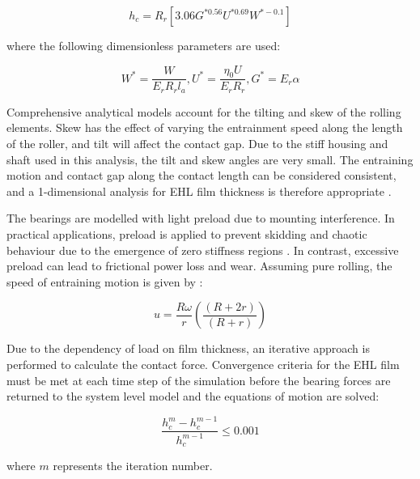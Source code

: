 \begin{equation}\label{DowsonToyodaCentralFilm}
	h_c=R_r\left[3.06 G^{* 0.56} U^{* 0.69} W^{*-0.1}\right]
\end{equation}

where the following dimensionless parameters are used:

\begin{equation}\label{DowsonToyodaDimensionless}
	W^*=\frac{W}{E_r R_r l_a}, U^*=\frac{\eta_0 U}{E_r R_r}, G^*=E_r \alpha
\end{equation}

Comprehensive analytical models \cite{Nelias2008} \cite{Majdoub2020} account for the tilting and skew of the rolling elements. Skew has the effect of varying the entrainment speed along the length of the roller, and tilt will affect the contact gap. Due to the stiff housing and shaft used in this analysis, the tilt and skew angles are very small. The entraining motion and contact gap along the contact length can be considered consistent, and a 1-dimensional analysis for EHL film thickness is therefore appropriate \cite{Gupta1979}.

The bearings are modelled with light preload due to mounting interference. In practical applications, preload is applied to prevent skidding and chaotic behaviour due to the emergence of zero stiffness regions \cite{Mevel1993}. In contrast, excessive preload can lead to frictional power loss and wear. Assuming pure rolling, the speed of entraining motion is given by \cite{Spikes2015} \cite{Shi2015}: 
	
\begin{equation}\label{SpikesEntrainmentSpeed}
	u=\frac{R \omega}{r}\left(\frac{(R+2 r)}{(R+r)}\right)
\end{equation}

Due to the dependency of load on film thickness, an iterative approach is performed to calculate the contact force. Convergence criteria for the EHL film must be met at each time step of the simulation before the bearing forces are returned to the system level model and the equations of motion are solved:

\begin{equation}\label{FilmConvergence}
	\frac{h_c^m-h_c^{m-1}}{h_c^{m-1}} \leq 0.001
\end{equation}

where $m$ represents the iteration number.

